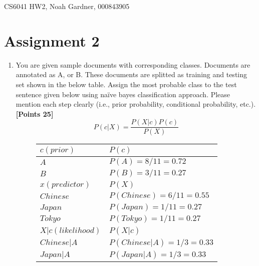 \documentclass[12pt]{article}
\begin{document}
CS6041 HW2, Noah Gardner, 000843905\newline

\section{Assignment 2}

\begin{enumerate}
    \item You are given sample documents with corresponding classes. Documents
          are annotated as A, or B. These documents are splitted as training and
          testing set shown in the below table. Assign the most probable class
          to the test sentence given below using naïve bayes classification
          approach. Please mention each step clearly (i.e., prior probability,
          conditional probability, etc.). \textbf{[Points 25]}
          \begin{equation}
              P(c|X) = \frac{P(X|c)P(c)}{P(X)}
          \end{equation}
          \begin{figure}[ht]
              \centering
              \begin{tabular}{|l|l|}
                  \hline\hline
                  $c (prior)$        & $P(c)$                              \\
                  \hline
                  $A$                & $P(A) = 8/11 = 0.72$                \\
                  $B$                & $P(B) = 3/11 = 0.27$                \\
                  \hline\hline
                  $x (predictor)$    & $P(X)$                              \\
                  \hline
                  $Chinese$          & $P(Chinese) = 6/11 = 0.55$          \\
                  $Japan$            & $P(Japan) = 1/11 = 0.27$            \\
                  $Tokyo$            & $P(Tokyo) = 1/11 = 0.27$            \\
                  \hline\hline
                  $X|c (likelihood)$ & $P(X|c)$                            \\
                  \hline
                  $Chinese|A$        & $P(Chinese|A) = 1/3 = 0.33$         \\
                  $Japan|A$          & $P(Japan|A) = 1/3 = 0.33$           \\

\end{tabular}
\end{figure}
\end{enumerate}
\end{document}
